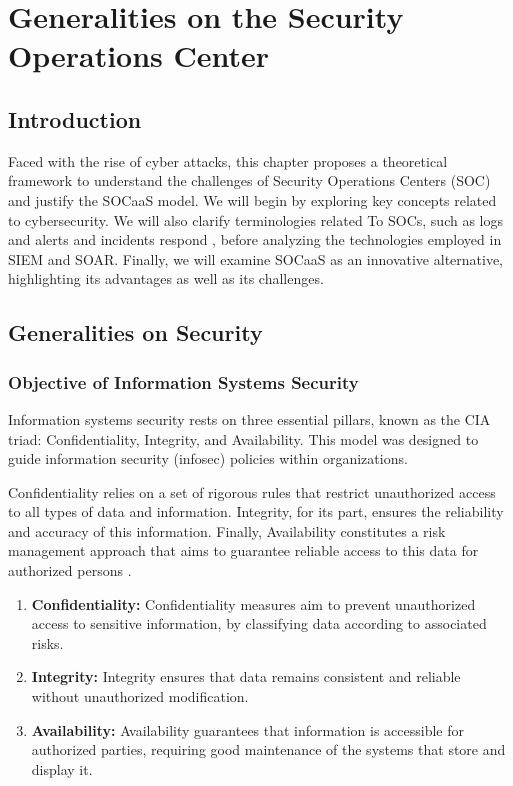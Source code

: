 \setcounter{chapter}{1}
\chapter{Generalities on the Security Operations Center}
\label{chap:generalities}

\section{Introduction}
\label{sec:intro}

Faced with the rise of cyber attacks, this chapter proposes a theoretical framework to understand the challenges of Security Operations Centers (SOC) and justify the SOCaaS model. We will begin by exploring key concepts related to cybersecurity. We will also clarify terminologies related To SOCs, such as logs and alerts and incidents respond , before analyzing the technologies employed in SIEM and SOAR. Finally, we will examine SOCaaS as an innovative alternative, highlighting its advantages as well as its challenges.

\section{Generalities on Security}
\label{sec:security}

\subsection{Objective of Information Systems Security}
\label{subsec:cia}

Information systems security rests on three essential pillars, known as the CIA triad: Confidentiality, Integrity, and Availability. This model was designed to guide information security (infosec) policies within organizations.

Confidentiality relies on a set of rigorous rules that restrict unauthorized access to all types of data and information. Integrity, for its part, ensures the reliability and accuracy of this information. Finally, Availability constitutes a risk management approach that aims to guarantee reliable access to this data for authorized persons \cite{ref6}.

\begin{enumerate}
    \item \textbf{Confidentiality:} Confidentiality measures aim to prevent unauthorized access to sensitive information, by classifying data according to associated risks.
    \item \textbf{Integrity:} Integrity ensures that data remains consistent and reliable without unauthorized modification.
    \item \textbf{Availability:} Availability guarantees that information is accessible for authorized parties, requiring good maintenance of the systems that store and display it.
\end{enumerate}

